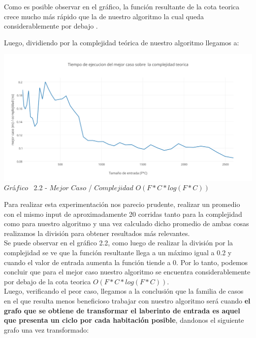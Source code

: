 Como es posible observar en el gr\'afico, la funci\'on resultante de la cota teorica crece mucho m\'as r\'apido que la de nuestro algoritmo la cual queda considerablemente por debajo .

Luego, dividiendo por la complejidad te\'orica de nuestro algoritmo llegamos a:\\

\vspace*{0.3cm} \vspace*{0.3cm}
  \begin{center}
\includegraphics[scale=0.65]{./EJ2/mejorcaso1.png}
{$Gr$\'a$fico$ \ 2.2 - $Mejor$ $Caso$ / $Complejidad$ $O(F*C* log(F*C))$}
  \end{center}
  \vspace*{0.3cm}

Para realizar esta experimentaci\'on nos parecio prudente, realizar un promedio con el mismo input de aproximadamente 20 corridas
tanto para la complejidad como para nuestro algoritmo y una vez calculado dicho promedio de ambas cosas realizamos la divisi\'on para
obtener resultados m\'as relevantes.\\ 

Se puede observar en el gr\'afico 2.2, como luego de realizar la divisi\'on por la complejidad se ve que la funci\'on resultante llega a un m\'aximo igual a 0.2 y cuando el valor de entrada aumenta la funci\'on tiende a 0. Por lo tanto, podemos concluir que para el mejor caso nuestro algoritmo se encuentra considerablemente por debajo de la cota teorica $O(F*C* log(F*C))$.\\

Luego, verificando el peor caso, llegamos a la conclusi\'on que la familia de casos en el que resulta menos beneficioso trabajar con nuestro algoritmo ser\'a cuando \textbf{el grafo que se obtiene de transformar el laberinto de entrada es aquel que presenta un ciclo por cada habitaci\'on posible}, dandonos el siguiente grafo una vez transformado:\\



